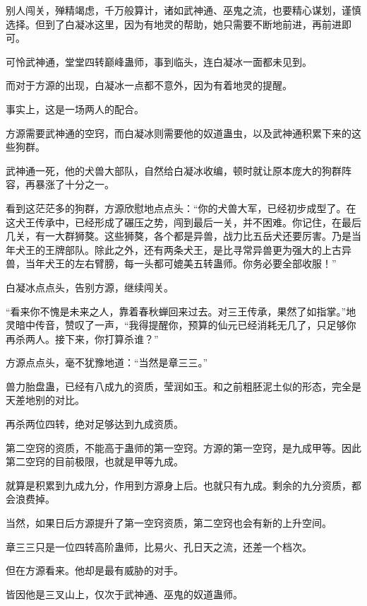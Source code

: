 
\begin{this_body}

别人闯关，殚精竭虑，千万般算计，诸如武神通、巫鬼之流，也要精心谋划，谨慎选择。但到了白凝冰这里，因为有地灵的帮助，她只需要不断地前进，再前进即可。

可怜武神通，堂堂四转巅峰蛊师，事到临头，连白凝冰一面都未见到。

而对于方源的出现，白凝冰一点都不意外，因为有着地灵的提醒。

事实上，这是一场两人的配合。

方源需要武神通的空窍，而白凝冰则需要他的奴道蛊虫，以及武神通积累下来的这些狗群。

武神通一死，他的犬兽大部队，自然给白凝冰收编，顿时就让原本庞大的狗群阵容，再暴涨了十分之一。

看到这茫茫多的狗群，方源欣慰地点点头：“你的犬兽大军，已经初步成型了。在这犬王传承中，已经形成了碾压之势，闯到最后一关，并不困难。你记住，在最后几关，有一大群狮獒。这些狮獒，各个都是异兽，战力比五岳犬还要厉害。乃是当年犬王的王牌部队。除此之外，还有两条犬王，是比寻常异兽更为强大的上古异兽，当年犬王的左右臂膀，每一头都可媲美五转蛊师。你务必要全部收服！”

白凝冰点点头，告别方源，继续闯关。

“看来你不愧是未来之人，靠着春秋蝉回来过去。对三王传承，果然了如指掌。”地灵暗中传音，赞叹了一声，“我得提醒你，预算的仙元已经消耗无几了，只足够你再杀两人。接下来，你打算杀谁？”

方源点点头，毫不犹豫地道：“当然是章三三。”

兽力胎盘蛊，已经有八成九的资质，莹润如玉。和之前粗胚泥土似的形态，完全是天差地别的对比。

再杀两位四转，绝对足够达到九成资质。

第二空窍的资质，不能高于蛊师的第一空窍。方源的第一空窍，是九成甲等。因此第二空窍的目前极限，也就是甲等九成。

就算是积累到九成九分，作用到方源身上后。也就只有九成。剩余的九分资质，都会浪费掉。

当然，如果日后方源提升了第一空窍资质，第二空窍也会有新的上升空间。

章三三只是一位四转高阶蛊师，比易火、孔日天之流，还差一个档次。

但在方源看来。他却是最有威胁的对手。

皆因他是三叉山上，仅次于武神通、巫鬼的奴道蛊师。


\end{this_body}
